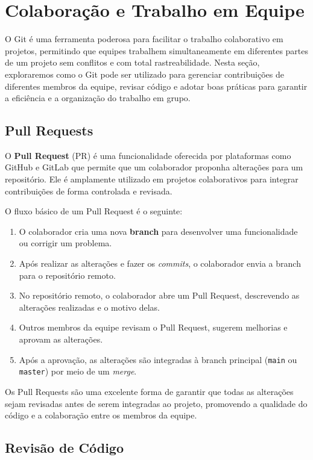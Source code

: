 \newpage
\section{Colaboração e Trabalho em Equipe}

O Git é uma ferramenta poderosa para facilitar o trabalho colaborativo em projetos, permitindo que equipes trabalhem simultaneamente em diferentes partes de um projeto sem conflitos e com total rastreabilidade. Nesta seção, exploraremos como o Git pode ser utilizado para gerenciar contribuições de diferentes membros da equipe, revisar código e adotar boas práticas para garantir a eficiência e a organização do trabalho em grupo.

\subsection{Pull Requests}

O \textbf{Pull Request} (PR) é uma funcionalidade oferecida por plataformas como GitHub e GitLab que permite que um colaborador proponha alterações para um repositório. Ele é amplamente utilizado em projetos colaborativos para integrar contribuições de forma controlada e revisada.

O fluxo básico de um Pull Request é o seguinte:
\begin{enumerate}
    \item O colaborador cria uma nova \textbf{branch} para desenvolver uma funcionalidade ou corrigir um problema.
    \item Após realizar as alterações e fazer os \textit{commits}, o colaborador envia a branch para o repositório remoto.
    \item No repositório remoto, o colaborador abre um Pull Request, descrevendo as alterações realizadas e o motivo delas.
    \item Outros membros da equipe revisam o Pull Request, sugerem melhorias e aprovam as alterações.
    \item Após a aprovação, as alterações são integradas à branch principal (\texttt{main} ou \texttt{master}) por meio de um \textit{merge}.
\end{enumerate}

Os Pull Requests são uma excelente forma de garantir que todas as alterações sejam revisadas antes de serem integradas ao projeto, promovendo a qualidade do código e a colaboração entre os membros da equipe.

\subsection{Revisão de Código}

